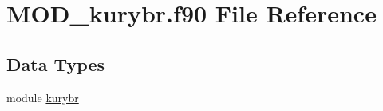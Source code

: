 \hypertarget{MOD__kurybr_8f90}{\section{M\-O\-D\-\_\-kurybr.\-f90 File Reference}
\label{MOD__kurybr_8f90}
}
\subsection*{Data Types}
\begin{DoxyCompactItemize}
\item 
module \hyperlink{classkurybr}{kurybr}
\end{DoxyCompactItemize}
